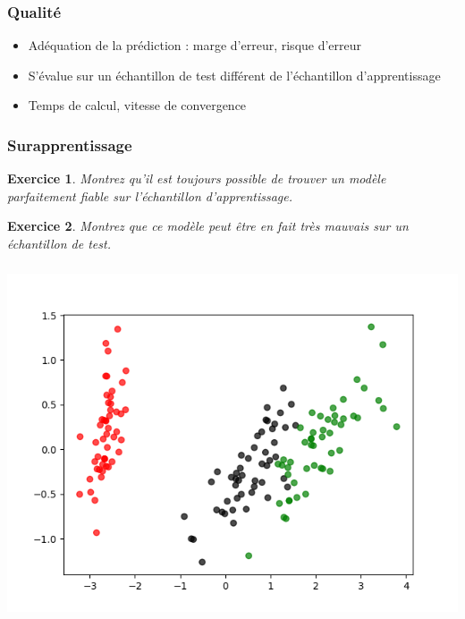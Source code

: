 \documentclass[11pt]{beamer}
\newenvironment{slide}[1]{%
\begin{frame}[environment=slide]
\frametitle{#1}
}{%
\end{frame}
}
\newtheorem{exercice}{Exercice}
\begin{document}
\begin{slide}{Qualité}

\begin{itemize}
	\item Adéquation de la prédiction : marge d'erreur, risque d'erreur
	\item S'évalue sur un échantillon de test différent de l'échantillon d'apprentissage
	\item Temps de calcul, vitesse de convergence
\end{itemize}

\end{slide}

\begin{slide}{Surapprentissage}

\begin{exercice}
Montrez qu'il est toujours possible de trouver un modèle parfaitement fiable sur l'échantillon d'apprentissage.
\end{exercice}

\pause

\begin{exercice}
Montrez que ce modèle peut être en fait très mauvais sur un échantillon de test.
\end{exercice}

\end{slide}

\begin{slide}{}

\includegraphics[scale=0.5]{A8classif}

\end{slide}
\end{document}
